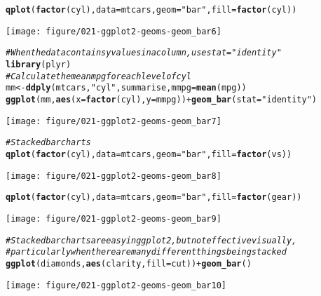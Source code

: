 \documentclass[a4paper,titlepage]{tufte-handout}\usepackage[]{graphicx}\usepackage[]{color}
\makeatletter
\def\maxwidth{ %
  \ifdim\Gin@nat@width>\linewidth
    \linewidth
  \else
    \Gin@nat@width
  \fi
}
\newcommand{\hlstr}[1]{\textcolor[rgb]{0.192,0.494,0.8}{#1}}%
\newcommand{\hlcom}[1]{\textcolor[rgb]{0.678,0.584,0.686}{\textit{#1}}}%
\newcommand{\hlopt}[1]{\textcolor[rgb]{0,0,0}{#1}}%
\newcommand{\hlstd}[1]{\textcolor[rgb]{0.345,0.345,0.345}{#1}}%
\newcommand{\hlkwb}[1]{\textcolor[rgb]{0.69,0.353,0.396}{#1}}%
\newcommand{\hlkwc}[1]{\textcolor[rgb]{0.333,0.667,0.333}{#1}}%
\newcommand{\hlkwd}[1]{\textcolor[rgb]{0.737,0.353,0.396}{\textbf{#1}}}%
\newenvironment{kframe}{%
 \def\at@end@of@kframe{}%
 \ifinner\ifhmode%
  \def\at@end@of@kframe{\end{minipage}}%
  \begin{minipage}{\columnwidth}%
 \fi\fi%
 \def\FrameCommand##1{\hskip\@totalleftmargin \hskip-\fboxsep
 \colorbox{shadecolor}{##1}\hskip-\fboxsep
     \hskip-\linewidth \hskip-\@totalleftmargin \hskip\columnwidth}%
 \MakeFramed {\advance\hsize-\width
   \@totalleftmargin\z@ \linewidth\hsize
   \@setminipage}}%
 {\par\unskip\endMakeFramed%
 \at@end@of@kframe}
\newenvironment{knitrout}{}{} %
\makeatother
\begin{document}
\begin{knitrout}
\begin{kframe}
\begin{alltt}
\hlkwd{qplot}\hlstd{(}\hlkwd{factor}\hlstd{(cyl),} \hlkwc{data}\hlstd{=mtcars,} \hlkwc{geom}\hlstd{=}\hlstr{"bar"}\hlstd{,} \hlkwc{fill}\hlstd{=}\hlkwd{factor}\hlstd{(cyl))}
\end{alltt}
\end{kframe}
\texttt{[image: figure/021-ggplot2-geoms-geom\_bar6]} 
\begin{kframe}\begin{alltt}
\hlcom{# When the data contains y values in a column, use stat="identity"}
\hlkwd{library}\hlstd{(plyr)}
\hlcom{# Calculate the mean mpg for each level of cyl}
\hlstd{mm} \hlkwb{<-} \hlkwd{ddply}\hlstd{(mtcars,} \hlstr{"cyl"}\hlstd{, summarise,} \hlkwc{mmpg} \hlstd{=} \hlkwd{mean}\hlstd{(mpg))}
\hlkwd{ggplot}\hlstd{(mm,} \hlkwd{aes}\hlstd{(}\hlkwc{x} \hlstd{=} \hlkwd{factor}\hlstd{(cyl),} \hlkwc{y} \hlstd{= mmpg))} \hlopt{+} \hlkwd{geom_bar}\hlstd{(}\hlkwc{stat} \hlstd{=} \hlstr{"identity"}\hlstd{)}
\end{alltt}
\end{kframe}
\texttt{[image: figure/021-ggplot2-geoms-geom\_bar7]} 
\begin{kframe}\begin{alltt}
\hlcom{# Stacked bar charts}
\hlkwd{qplot}\hlstd{(}\hlkwd{factor}\hlstd{(cyl),} \hlkwc{data}\hlstd{=mtcars,} \hlkwc{geom}\hlstd{=}\hlstr{"bar"}\hlstd{,} \hlkwc{fill}\hlstd{=}\hlkwd{factor}\hlstd{(vs))}
\end{alltt}
\end{kframe}
\texttt{[image: figure/021-ggplot2-geoms-geom\_bar8]} 
\begin{kframe}\begin{alltt}
\hlkwd{qplot}\hlstd{(}\hlkwd{factor}\hlstd{(cyl),} \hlkwc{data}\hlstd{=mtcars,} \hlkwc{geom}\hlstd{=}\hlstr{"bar"}\hlstd{,} \hlkwc{fill}\hlstd{=}\hlkwd{factor}\hlstd{(gear))}
\end{alltt}
\end{kframe}
\texttt{[image: figure/021-ggplot2-geoms-geom\_bar9]} 
\begin{kframe}\begin{alltt}
\hlcom{# Stacked bar charts are easy in ggplot2, but not effective visually,}
\hlcom{# particularly when there are many different things being stacked}
\hlkwd{ggplot}\hlstd{(diamonds,} \hlkwd{aes}\hlstd{(clarity,} \hlkwc{fill}\hlstd{=cut))} \hlopt{+} \hlkwd{geom_bar}\hlstd{()}
\end{alltt}
\end{kframe}
\texttt{[image: figure/021-ggplot2-geoms-geom\_bar10]} 

\end{knitrout}
\end{document}
